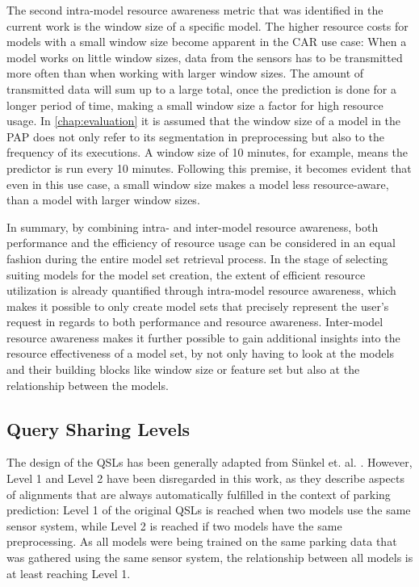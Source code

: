 The second intra-model resource awareness metric that was identified in the current work is the window size of a specific model. The higher resource costs for models with a small window size become apparent in the CAR use case: When a model works on little window sizes, data from the sensors has to be transmitted more often than when working with larger window sizes. The amount of transmitted data will sum up to a large total, once the prediction is done for a longer period of time, making a small window size a factor for high resource usage. In \autoref{chap:evaluation} it is assumed that the window size of a model in the PAP does not only refer to its segmentation in preprocessing but also to the frequency of its executions. A window size of 10 minutes, for example, means the predictor is run every 10 minutes. Following this premise, it becomes evident that even in this use case, a small window size makes a model less resource-aware, than a model with larger window sizes. 

In summary, by combining intra- and inter-model resource awareness, both performance and the efficiency of resource usage can be considered in an equal fashion during the entire model set retrieval process. In the stage of selecting suiting models for the model set creation, the extent of efficient resource utilization is already quantified through intra-model resource awareness, which makes it possible to only create model sets that precisely represent the user's request in regards to both performance and resource awareness. Inter-model resource awareness makes it further possible to gain additional insights into the resource effectiveness of a model set, by not only having to look at the models and their building blocks like window size or feature set but also at the relationship between the models.

\subsection{Query Sharing Levels}

The design of the QSLs has been generally adapted from Sünkel et. al. \cite{sunkel2022}. However, Level 1 and Level 2 have been disregarded in this work, as they describe aspects of alignments that are always automatically fulfilled in the context of parking prediction: Level 1 of the original QSLs is reached when two models use the same sensor system, while Level 2 is reached if two models have the same preprocessing. As all models were being trained on the same parking data that was gathered using the same sensor system, the relationship between all models is at least reaching Level 1.

